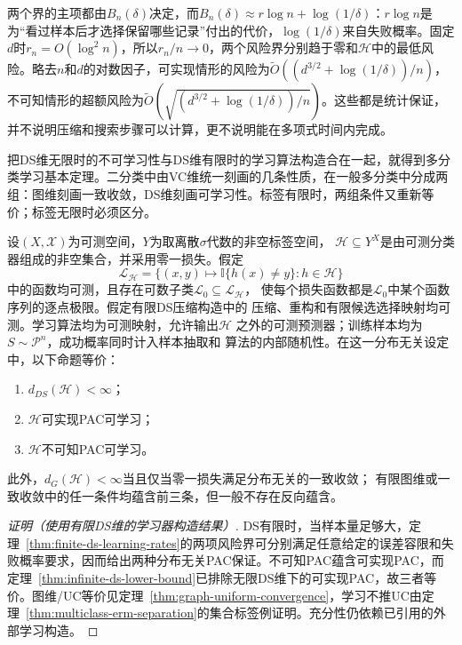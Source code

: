 两个界的主项都由$B_n(\delta)$决定，而$B_n(\delta)\approx r\log n+\log(1/\delta)$：$r\log n$是为“看过样本后才选择保留哪些记录”付出的代价，$\log(1/\delta)$来自失败概率。固定$d$时$r_n=O(\log^2n)$，所以$r_n/n\to0$，两个风险界分别趋于零和$\mathcal H$中的最低风险。略去$n$和$d$的对数因子，可实现情形的风险为$\widetilde O((d^{3/2}+\log(1/\delta))/n)$，不可知情形的超额风险为$\widetilde O(\sqrt{(d^{3/2}+\log(1/\delta))/n})$。这些都是统计保证，并不说明压缩和搜索步骤可以计算，更不说明能在多项式时间内完成。

把DS维无限时的不可学习性与DS维有限时的学习算法构造合在一起，就得到多分类学习基本定理。二分类中由VC维统一刻画的几条性质，在一般多分类中分成两组：图维刻画一致收敛，DS维刻画可学习性。标签有限时，两组条件又重新等价；标签无限时必须区分。

\begin{theorem}[多分类学习基本定理]
\label{thm:ds-characterization}
设$(X,\mathcal X)$为可测空间，$Y$为取离散$\sigma$代数的非空标签空间，
$\mathcal H\subseteq Y^X$是由可测分类器组成的非空集合，并采用零一损失。假定
\[
 \mathcal L_{\mathcal H}
 =\{(x,y)\mapsto\mathbb I\{h(x)\neq y\}:h\in\mathcal H\}
\]
中的函数均可测，且存在可数子类$\mathcal L_0\subseteq\mathcal L_{\mathcal H}$，
使每个损失函数都是$\mathcal L_0$中某个函数序列的逐点极限。假定有限DS压缩构造中的
压缩、重构和有限候选选择映射均可测。学习算法均为可测映射，允许输出$\mathcal H$
之外的可测预测器；训练样本均为$S\sim\mathcal P^n$，成功概率同时计入样本抽取和
算法的内部随机性。在这一分布无关设定中，以下命题等价：
\begin{enumerate}
 \item $d_{DS}(\mathcal H)<\infty$；
 \item $\mathcal H$可实现PAC可学习；
 \item $\mathcal H$不可知PAC可学习。
\end{enumerate}
此外，$d_G(\mathcal H)<\infty$当且仅当零一损失满足分布无关的一致收敛；
有限图维或一致收敛中的任一条件均蕴含前三条，但一般不存在反向蕴含。
\end{theorem}

\begin{proof}[证明（使用有限DS维的学习器构造结果）]
DS有限时，当样本量足够大，定理~\ref{thm:finite-ds-learning-rates}的两项风险界可分别满足任意给定的误差容限和失败概率要求，因而给出两种分布无关PAC保证。不可知PAC蕴含可实现PAC，而定理~\ref{thm:infinite-ds-lower-bound}已排除无限DS维下的可实现PAC，故三者等价。图维/UC等价见定理~\ref{thm:graph-uniform-convergence}，学习不推UC由定理~\ref{thm:multiclass-erm-separation}的集合标签例证明。充分性仍依赖已引用的外部学习构造。
\end{proof}


